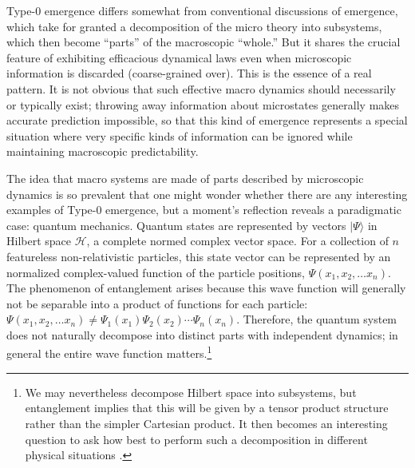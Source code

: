 \documentclass[12pt,english]{article}
\newcommand{\autocite}{\cite}
\begin{document}
Type-0 emergence differs somewhat from conventional discussions of emergence, which take for granted a decomposition of the micro theory into subsystems, which then become ``parts'' of the macroscopic ``whole.''
But it shares the crucial feature of exhibiting efficacious dynamical laws even when microscopic information is discarded (coarse-grained over).
This is the essence of a real pattern.
It is not obvious that such effective macro dynamics should necessarily or typically exist; throwing away information about microstates generally makes accurate prediction impossible, so that this kind of emergence represents a special situation where very specific kinds of information can be ignored while maintaining macroscopic predictability. 

The idea that macro systems are made of parts described by microscopic dynamics is so prevalent that one might wonder whether there are any interesting examples of Type-0 emergence, but a moment's reflection reveals a paradigmatic case: quantum mechanics.
Quantum states are represented by vectors $|\Psi\rangle$ in Hilbert space $\mathcal{H}$, a complete normed complex vector space. 
For a collection of $n$ featureless non-relativistic particles, this state vector can be represented by an normalized complex-valued function of the particle positions, $\Psi(x_1, x_2, \ldots x_n)$.
The phenomenon of entanglement arises because this wave function will generally not be separable into a product of functions for each particle: $\Psi(x_1, x_2, \ldots x_n)\neq \Psi_1(x_1)\Psi_2(x_2)\cdots \Psi_n(x_n)$.
Therefore, the quantum system does not naturally decompose into distinct parts with independent dynamics; in general the entire wave function matters.\footnote{We may nevertheless decompose Hilbert space into subsystems, but entanglement implies that this will be given by a tensor product structure rather than the simpler Cartesian product. It then becomes an interesting question to ask how best to perform such a decomposition in different physical situations \autocite{Carroll:2020gme}.}
\end{document}
